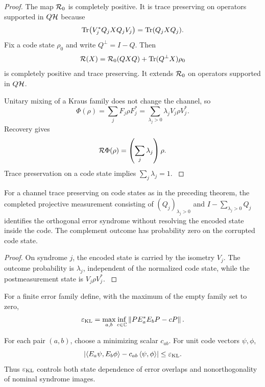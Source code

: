 \begin{proof}\label{strong:proof:041}
The map \(\mathcal R_0\) is completely positive. It is trace preserving on operators supported in \(Q\mathcal H\) because
\[
\operatorname{Tr}\bigl(V_j^*Q_jXQ_jV_j\bigr)
=
\operatorname{Tr}(Q_jXQ_j).
\]
Fix a code state \(\rho_0\) and write \(Q^\perp=I-Q\). Then
\[
\mathcal R(X)
=
\mathcal R_0(QXQ)
+
\operatorname{Tr}(Q^\perp X)\rho_0
\]
is completely positive and trace preserving. It extends \(\mathcal R_0\) on operators supported in \(Q\mathcal H\).

Unitary mixing of a Kraus family does not change the channel, so
\[
\Phi(\rho)
=
\sum_jF_j\rho F_j^*
=
\sum_{\lambda_j>0}
\lambda_jV_j\rho V_j^*.
\]
Recovery gives
\[
\mathcal R\Phi(\rho)
=
\left(\sum_j\lambda_j\right)\rho.
\]
Trace preservation on a code state implies \(\sum_j\lambda_j=1\).
\label{strong:proof:041:end}\end{proof}

\begin{corollary}\label{strong:corollary:011}\label{strong:cor:syndrome_preserves_logic}
For a channel trace preserving on code states as in the preceding theorem, the completed projective measurement consisting of \((Q_j)_{\lambda_j>0}\) and \(I-\sum_{\lambda_j>0}Q_j\) identifies the orthogonal error syndrome without resolving the encoded state inside the code. The complement outcome has probability zero on the corrupted code state.
\end{corollary}

\begin{proof}\label{strong:proof:042}
On syndrome \(j\), the encoded state is carried by the isometry \(V_j\). The outcome probability is \(\lambda_j\), independent of the normalized code state, while the postmeasurement state is \(V_j\rho V_j^*\).
\label{strong:proof:042:end}\end{proof}

\begin{definition}\label{strong:definition:006}\label{strong:def:approximate_kl}
For a finite error family define, with the maximum of the empty family set to zero,
\[
\varepsilon_{\rm KL}
=
\max_{a,b}
\inf_{c\in\mathbb C}
\left\lVert PE_a^*E_bP-cP\right\rVert.
\]
\end{definition}

\begin{proposition}\label{strong:proposition:003}\label{strong:prop:approximate_kl_meaning}
For each pair \((a,b)\), choose a minimizing scalar \(c_{ab}\). For unit code vectors \(\psi,\phi\),
\[
\left\lvert
\left\langle E_a\psi,E_b\phi\right\rangle
-c_{ab}\left\langle\psi,\phi\right\rangle
\right\rvert
\leq
\varepsilon_{\rm KL}.
\]
Thus \(\varepsilon_{\rm KL}\) controls both state dependence of error overlaps and nonorthogonality of nominal syndrome images.
\end{proposition}

